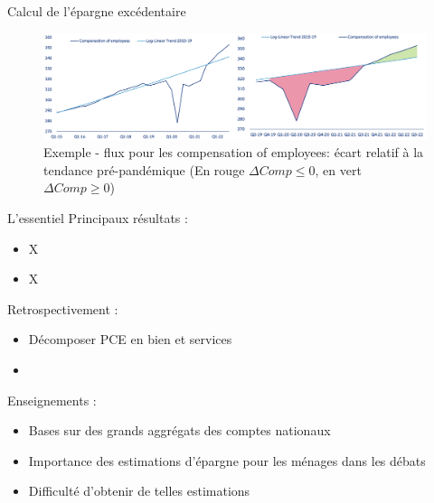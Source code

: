 \documentclass[9pt, xcolor={dvipsnames}]{beamer}
\begin{document}
\begin{frame}{Calcul de l'épargne excédentaire}
  \begin{figure}
    \centering
    \includegraphics[width=1\textwidth]{img/excess_chart.png}
    \caption{Exemple - flux pour les compensation of employees: écart relatif à la tendance pré-pandémique (En rouge $\Delta Comp \leq 0$, en vert $\Delta Comp \geq  0$)}
  \end{figure}
\end{frame}

\begin{frame}{L'essentiel}
  Principaux résultats :
  \begin{itemize}
    \item X
    \item X
  \end{itemize}
  \vspace{.2cm}
  Retrospectivement :
  \begin{itemize}
    \item Décomposer PCE en bien et services
    \item 
  \end{itemize}
  \vspace{.2cm}
  Enseignements :
  \begin{itemize}
    \item Bases sur des grands aggrégats des comptes nationaux
    \item Importance des estimations d'épargne pour les ménages dans les débats  
    \item Difficulté d'obtenir de telles estimations
  \end{itemize}
\end{frame}

\end{document}
